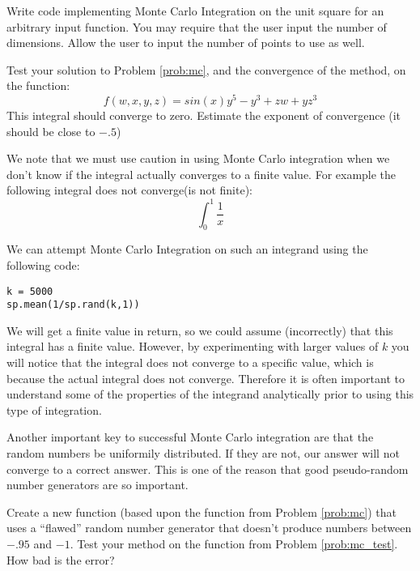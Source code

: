 \begin{problem}
\label{prob:mc}
Write code implementing Monte Carlo Integration on the unit square for an arbitrary input function. You may require that the user input the number of dimensions. Allow the user to input the number of points to use as well.
\end{problem}

\begin{problem}
\label{prob:mc_test}
Test your solution to Problem \ref{prob:mc}, and the convergence of the method, on the function:
\[
f(w,x,y,z) = sin(x) y^5 -y^3 + zw + yz^3
\]
This integral should converge to zero. Estimate the exponent of convergence (it should be close to $-.5$)
\end{problem}

We note that we must use caution in using Monte Carlo integration when we don't know if the integral actually converges to a finite value. For example the following integral does not converge(is not finite):
\[
\int_0^1 \frac{1}{x}
\]

We can attempt Monte Carlo Integration on such an integrand using the following code:
\begin{lstlisting}
k = 5000
sp.mean(1/sp.rand(k,1))
\end{lstlisting}

We will get a finite value in return, so we could assume (incorrectly) that this integral has a finite value. However, by experimenting with larger values of $k$ you will notice that the integral does not converge to a specific value, which is because the actual integral does not converge. Therefore it is often important to understand some of the properties of the integrand analytically prior to using this type of integration.

Another important key to successful Monte Carlo integration are that the random numbers be uniformily distributed. If they are not, our answer will not converge to a correct answer. This is one of the reason that good pseudo-random number generators are so important.

\begin{problem}
\label{prob:mc_flawed}
Create a new function (based upon the function from Problem \ref{prob:mc}) that uses a ``flawed'' random number generator that doesn't produce numbers between $-.95$ and $-1$. Test your method on the function from Problem \ref{prob:mc_test}. How bad is the error? 
\end{problem}
